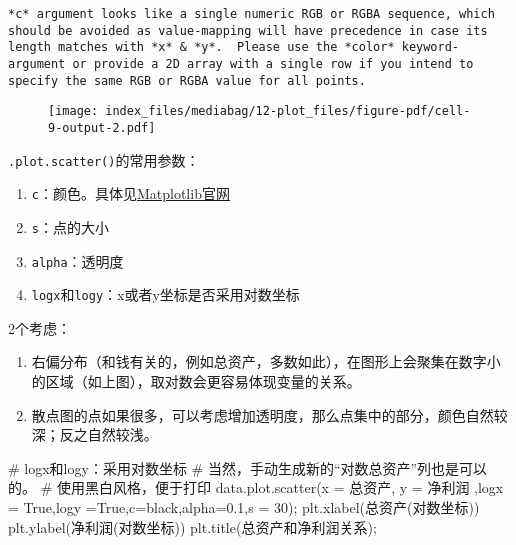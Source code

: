 \documentclass[
  letterpaper,
  DIV=11,
  numbers=noendperiod]{scrreprt}
\newenvironment{Shaded}{\begin{snugshade}}{\end{snugshade}}
\newcommand{\CommentTok}[1]{\textcolor[rgb]{0.37,0.37,0.37}{#1}}
\newcommand{\DecValTok}[1]{\textcolor[rgb]{0.68,0.00,0.00}{#1}}
\newcommand{\FloatTok}[1]{\textcolor[rgb]{0.68,0.00,0.00}{#1}}
\newcommand{\NormalTok}[1]{\textcolor[rgb]{0.00,0.23,0.31}{#1}}
\newcommand{\OperatorTok}[1]{\textcolor[rgb]{0.37,0.37,0.37}{#1}}
\newcommand{\StringTok}[1]{\textcolor[rgb]{0.13,0.47,0.30}{#1}}
\newcommand{\VariableTok}[1]{\textcolor[rgb]{0.07,0.07,0.07}{#1}}
\providecommand{\tightlist}{%
  \setlength{\itemsep}{0pt}\setlength{\parskip}{0pt}}\usepackage{longtable,booktabs,array}
\begin{document}
\begin{verbatim}
*c* argument looks like a single numeric RGB or RGBA sequence, which should be avoided as value-mapping will have precedence in case its length matches with *x* & *y*.  Please use the *color* keyword-argument or provide a 2D array with a single row if you intend to specify the same RGB or RGBA value for all points.
\end{verbatim}

\begin{figure}[H]

{\centering \texttt{[image: index\_files/mediabag/12-plot\_files/figure-pdf/cell-9-output-2.pdf]}

}

\end{figure}

\texttt{.plot.scatter()}的常用参数：

\begin{enumerate}
\def\labelenumi{\arabic{enumi}.}
\tightlist
\item
  \texttt{c}：颜色。具体见\href{https://matplotlib.org/stable/gallery/color/named_colors.html}{Matplotlib官网}
\item
  \texttt{s}：点的大小
\item
  \texttt{alpha}：透明度
\item
  \texttt{logx}和\texttt{logy}：x或者y坐标是否采用对数坐标
\end{enumerate}

2个考虑：

\begin{enumerate}
\def\labelenumi{\arabic{enumi}.}
\tightlist
\item
  右偏分布（和钱有关的，例如总资产，多数如此），在图形上会聚集在数字小的区域（如上图），取对数会更容易体现变量的关系。
\item
  散点图的点如果很多，可以考虑增加透明度，那么点集中的部分，颜色自然较深；反之自然较浅。
\end{enumerate}

\begin{Shaded}
\begin{Highlighting}[]
\CommentTok{\# logx和logy：采用对数坐标}
\CommentTok{\# 当然，手动生成新的“对数总资产”列也是可以的。}
\CommentTok{\# 使用黑白风格，便于打印}
\NormalTok{data.plot.scatter(x }\OperatorTok{=} \StringTok{\textquotesingle{}总资产\textquotesingle{}}\NormalTok{, y }\OperatorTok{=} \StringTok{\textquotesingle{}净利润\textquotesingle{}}\NormalTok{ ,logx }\OperatorTok{=} \VariableTok{True}\NormalTok{,logy }\OperatorTok{=}\VariableTok{True}\NormalTok{,c}\OperatorTok{=}\StringTok{\textquotesingle{}black\textquotesingle{}}\NormalTok{,alpha}\OperatorTok{=}\FloatTok{0.1}\NormalTok{,s }\OperatorTok{=} \DecValTok{30}\NormalTok{)}\OperatorTok{;}
\NormalTok{plt.xlabel(}\StringTok{\textquotesingle{}总资产(对数坐标)\textquotesingle{}}\NormalTok{)}
\NormalTok{plt.ylabel(}\StringTok{\textquotesingle{}净利润(对数坐标)\textquotesingle{}}\NormalTok{)}
\NormalTok{plt.title(}\StringTok{\textquotesingle{}总资产和净利润关系\textquotesingle{}}\NormalTok{)}\OperatorTok{;}
\end{Highlighting}
\end{Shaded}
\end{document}
